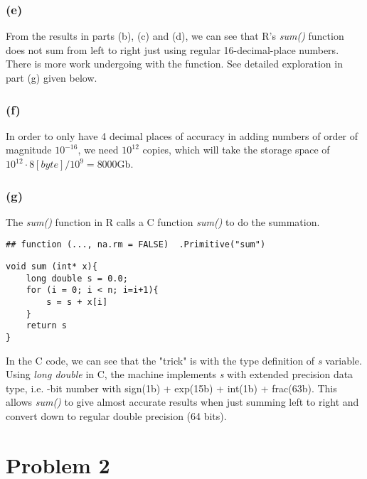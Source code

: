 \documentclass{article}\usepackage{graphicx, color}
\makeatletter
\newenvironment{kframe}{%
 \def\at@end@of@kframe{}%
 \ifinner\ifhmode%
  \def\at@end@of@kframe{\end{minipage}}%
  \begin{minipage}{\columnwidth}%
 \fi\fi%
 \def\FrameCommand##1{\hskip\@totalleftmargin \hskip-\fboxsep
 \colorbox{shadecolor}{##1}\hskip-\fboxsep
     \hskip-\linewidth \hskip-\@totalleftmargin \hskip\columnwidth}%
 \MakeFramed {\advance\hsize-\width
   \@totalleftmargin\z@ \linewidth\hsize
   \@setminipage}}%
 {\par\unskip\endMakeFramed%
 \at@end@of@kframe}
\newenvironment{knitrout}{}{} %
\makeatother
\begin{document}
\subsubsection*{(e)}
From the results in parts (b), (c) and (d), we can see that R's \textit{sum()} function does not sum
from left to right just using regular 16-decimal-place numbers. There is more work undergoing with the function.
See detailed exploration in part (g) given below.

\subsubsection*{(f)}
In order to only have 4 decimal places of accuracy in adding numbers of order of magnitude $10^{-16}$,
we need $10^{12}$ copies, which will take the storage space of $10^{12}\cdot 8[byte]/10^9 = $8000Gb.

\subsubsection*{(g)}
The \textit{sum()} function in R calls a C function \textit{sum()} to do the summation.
\begin{knitrout}
\color{fgcolor}\begin{kframe}
\begin{verbatim}
## function (..., na.rm = FALSE)  .Primitive("sum")
\end{verbatim}
\end{kframe}
\end{knitrout}

\begin{lstlisting}
void sum (int* x){
	long double s = 0.0;
	for (i = 0; i < n; i=i+1){
		s = s + x[i]
	}
	return s
}
\end{lstlisting}

In the C code, we can see that the "trick" is with the type definition of \textit{s} variable.
Using \textit{long double} in C, the machine implements \textit{s} with extended precision data type, i.e. -bit number with sign(1b) + exp(15b) + int(1b) + frac(63b). This allows \textit{sum()} to give
almost accurate results when just summing left to right and convert down to regular double precision (64 bits).





\newpage
\section*{Problem 2}
\end{document}
